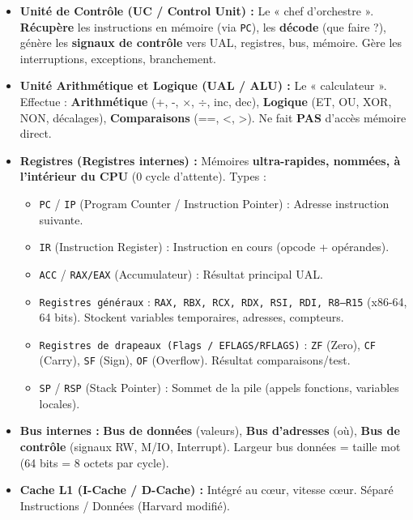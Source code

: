 \documentclass[11pt]{article}
\begin{document}
\begin{definition}
\begin{itemize}
    \item \textbf{Unité de Contrôle (UC / Control Unit) :} Le « chef d'orchestre ». \textbf{Récupère} les instructions en mémoire (via \texttt{PC}), les \textbf{décode} (que faire ?), génère les \textbf{signaux de contrôle} vers UAL, registres, bus, mémoire. Gère les interruptions, exceptions, branchement.
    \item \textbf{Unité Arithmétique et Logique (UAL / ALU) :} Le « calculateur ». Effectue : \textbf{Arithmétique} (+, -, $\times$, $\div$, inc, dec), \textbf{Logique} (ET, OU, XOR, NON, décalages), \textbf{Comparaisons} (==, <, >). Ne fait \textbf{PAS} d'accès mémoire direct.
    \item \textbf{Registres (Registres internes) :} Mémoires \textbf{ultra-rapides, nommées, à l'intérieur du CPU} (0 cycle d'attente). Types :
        \begin{itemize}
            \item \texttt{PC} / \texttt{IP} (Program Counter / Instruction Pointer) : Adresse instruction suivante.
            \item \texttt{IR} (Instruction Register) : Instruction en cours (opcode + opérandes).
            \item \texttt{ACC} / \texttt{RAX/EAX} (Accumulateur) : Résultat principal UAL.
            \item \texttt{Registres généraux} : \texttt{RAX, RBX, RCX, RDX, RSI, RDI, R8--R15} (x86-64, 64 bits). Stockent variables temporaires, adresses, compteurs.
            \item \texttt{Registres de drapeaux (Flags / EFLAGS/RFLAGS)} : \texttt{ZF} (Zero), \texttt{CF} (Carry), \texttt{SF} (Sign), \texttt{OF} (Overflow). Résultat comparaisons/test.
            \item \texttt{SP} / \texttt{RSP} (Stack Pointer) : Sommet de la pile (appels fonctions, variables locales).
        \end{itemize}
    \item \textbf{Bus internes :} \textbf{Bus de données} (valeurs), \textbf{Bus d'adresses} (où), \textbf{Bus de contrôle} (signaux RW, M/IO, Interrupt). Largeur bus données = taille mot (64 bits = 8 octets par cycle).
    \item \textbf{Cache L1 (I-Cache / D-Cache) :} Intégré au cœur, vitesse cœur. Séparé Instructions / Données (Harvard modifié).
\end{itemize}
\end{definition}
\end{document}
